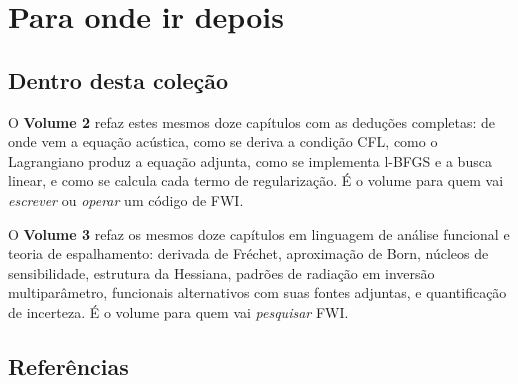 \documentclass[11pt,a4paper,oneside]{report}
\begin{document}
\chapter{Para onde ir depois}

\section*{Dentro desta cole\c{c}\~ao}

O \textbf{Volume 2} refaz estes mesmos doze cap\'itulos com as dedu\c{c}\~oes
completas: de onde vem a equa\c{c}\~ao ac\'ustica, como se deriva a
condi\c{c}\~ao CFL, como o Lagrangiano produz a equa\c{c}\~ao adjunta, como
se implementa l-BFGS e a busca linear, e como se calcula cada termo de
regulariza\c{c}\~ao. \'E o volume para quem vai \emph{escrever} ou
\emph{operar} um c\'odigo de FWI.

O \textbf{Volume 3} refaz os mesmos doze cap\'itulos em linguagem de
an\'alise funcional e teoria de espalhamento: derivada de Fr\'echet,
aproxima\c{c}\~ao de Born, n\'ucleos de sensibilidade, estrutura da Hessiana,
padr\~oes de radia\c{c}\~ao em invers\~ao multipar\^ametro, funcionais
alternativos com suas fontes adjuntas, e quantifica\c{c}\~ao de incerteza. \'E
o volume para quem vai \emph{pesquisar} FWI.

\section*{Refer\^encias}
\end{document}
